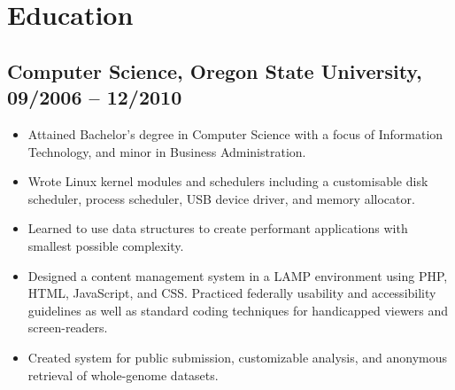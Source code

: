 \documentclass[a4paper,12pt]{report}
\begin{document}
\section*{Education}

\subsection*{Computer Science, Oregon State University, 09/2006 -- 12/2010}
\begin{itemize}
\item Attained Bachelor’s degree in Computer Science with a focus of Information Technology, and minor in Business Administration.
\item Wrote Linux kernel modules and schedulers including a customisable disk scheduler, process scheduler, USB device driver, and memory allocator.
\item Learned to use data structures to create performant applications with smallest possible complexity.
\item Designed a content management system in a LAMP environment using PHP, HTML, JavaScript, and CSS. Practiced federally usability and accessibility guidelines as well as standard coding techniques for handicapped viewers and screen-readers.
\item Created system for public submission, customizable analysis, and anonymous retrieval of whole-genome datasets.

\end{itemize}
\end{document}
